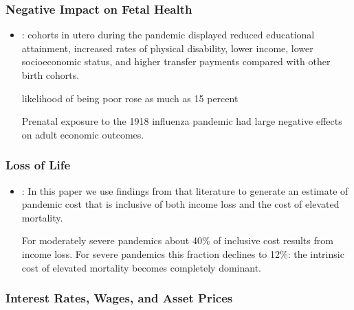 \documentclass[12pt,a4paper]{article}
\begin{document}
\subsubsection{Negative Impact on Fetal Health}
\begin{itemize}
	\item \cite{almond1918InfluenzaPandemic2006}: cohorts in utero during
	the pandemic displayed reduced educational attainment, increased
	rates of physical disability, lower income, lower socioeconomic status,
	and higher transfer payments compared with other birth cohorts.
	
	likelihood of being poor rose as much as 15 percent
	
	Prenatal exposure to the 1918 influenza pandemic had large negative
	effects on adult economic outcomes. 
\end{itemize}

\subsubsection{Loss of Life}

\begin{itemize}
	\item \cite{fanInclusiveCostPandemic2016}: In this paper we use findings from that literature to generate an
	estimate of pandemic cost that is inclusive of both income loss and the cost of elevated mortality.
	
	For moderately severe pandemics about 40\% of inclusive cost results from income loss. For
	severe pandemics this fraction declines to 12\%: the intrinsic cost of elevated mortality becomes
	completely dominant.
\end{itemize}

\subsubsection{Interest Rates, Wages, and Asset Prices}
\end{document}
